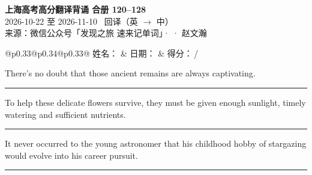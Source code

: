 \documentclass[11pt,a4paper]{article}
\newcommand{\num}[1]{\makebox[1.9em][r]{#1.}\hspace{0.3em}}
\newcommand{\wline}{\noindent\rule{\linewidth}{0.4pt}}
\begin{document}
\pagestyle{plain}
\begin{center}
{\LARGE\bfseries 上海高考高分翻译背诵 \quad 合册 120–128}\\[0.25em]
{\large 2026-10-22 至 2026-11-10 \quad\ 回译（英 $\to$ 中）}\\[0.35em]
{\footnotesize 来源：微信公众号「发现之旅 速来记单词」·  · 赵文瀚}
\end{center}

\vspace{0.4em}
\noindent\begin{tabular}{@{}p{0.33\textwidth}@{}p{0.34\textwidth}@{}p{0.33\textwidth}@{}}
姓名：\underline{\hspace{2.0cm}} & 日期：\underline{\hspace{2.0cm}} & 得分：\underline{\hspace{1.4cm}}\,/ \\
\end{tabular}

\vspace{0.5em}

\vspace{0.8em}
\vspace{0.35em}\vspace{0.15em}

\begin{minipage}{\linewidth}

\num{1}There’s no doubt that those ancient remains are always captivating.

\vspace{0.25em}

\wline

\end{minipage}

\begin{minipage}{\linewidth}

\num{2}To help these delicate flowers survive, they must be given enough sunlight, timely watering and sufficient nutrients.

\vspace{0.25em}

\wline

\end{minipage}

\begin{minipage}{\linewidth}

\num{3}It never occurred to the young astronomer that his childhood hobby of stargazing would evolve into his career pursuit.

\vspace{0.25em}

\wline

\end{minipage}
\end{document}
